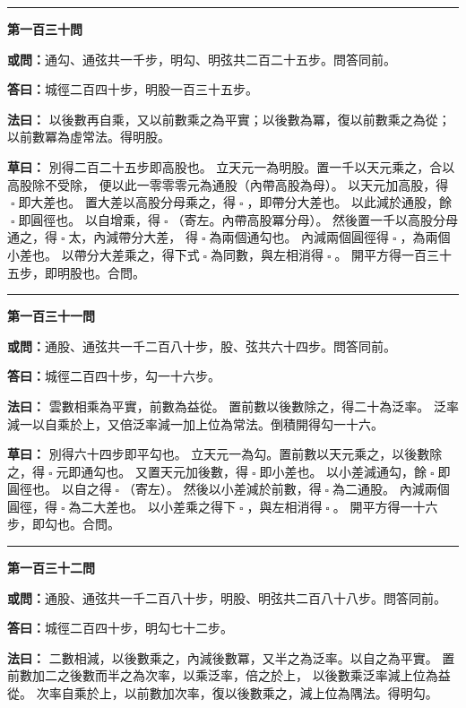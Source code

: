 \documentclass[11pt,a4paper]{article}
\let\origsquare\square
\renewcommand{\square}{\ensuremath{\origsquare}}%
\newcommand{\longline}{\noindent\rule{\textwidth}{0.4pt}}
\newcommand{\owen}[1]{%
  \par\vspace{0.4em}%
  \noindent\textcolor{problemcolor}{\textbf{或問：}}{\tradfont #1}\par\nopagebreak%
}
\newcommand{\fayue}[1]{%
  \par\noindent\textcolor{methodcolor}{\textbf{法曰：}}{\tradfont #1}\par\nopagebreak%
}
\newcommand{\tsaoyue}[1]{%
  \par\noindent\textcolor{workcolor}{\textbf{草曰：}}{\tradfont #1}\par%
}
\newcommand{\dayue}[1]{%
  \par\noindent\textcolor{anscolor}{\textbf{答曰：}}{\tradfont #1}\par\nopagebreak%
}
\newcommand{\wen}[1]{\par\vspace{0.3em}\noindent\textcolor{problemcolor}{\textbf{第#1問}}\par}
\begin{document}
\vspace{0.5cm}
\begin{center}
\longline
\end{center}

\wen{一百三十}
\owen{通勾、通弦共一千步，明勾、明弦共二百二十五步。問答同前。}
\dayue{城徑二百四十步，明股一百三十五步。}

\fayue{%
以後數再自乘，又以前數乘之為平實；以後數為冪，復以前數乘之為從；
以前數冪為虛常法。得明股。}

\tsaoyue{%
別得二百二十五步即高股也。
立天元一為明股。置一千以天元乘之，合以高股除不受除，
便以此一零零零元為通股（內帶高股為母）。
以天元加高股，得$ \; \square \; $即大差也。
置大差以高股分母乘之，得$ \; \square \; $，即帶分大差也。
以此減於通股，餘$ \; \square \; $即圓徑也。
以自增乘，得$ \; \square \; $（寄左。內帶高股冪分母）。
然後置一千以高股分母通之，得$ \; \square \; $太，內減帶分大差，
得$ \; \square \; $為兩個通勾也。
內減兩個圓徑得$ \; \square \; $，為兩個小差也。
以帶分大差乘之，得下式$ \; \square \; $為同數，與左相消得$ \; \square \; $。
開平方得一百三十五步，即明股也。合問。}

\vspace{0.5cm}
\begin{center}
\longline
\end{center}

\wen{一百三十一}
\owen{通股、通弦共一千二百八十步，股、弦共六十四步。問答同前。}
\dayue{城徑二百四十步，勾一十六步。}

\fayue{%
雲數相乘為平實，前數為益從。
置前數以後數除之，得二十為泛率。
泛率減一以自乘於上，又倍泛率減一加上位為常法。倒積開得勾一十六。}

\tsaoyue{%
別得六十四步即平勾也。
立天元一為勾。置前數以天元乘之，以後數除之，得$ \; \square \; $元即通勾也。
又置天元加後數，得$ \; \square \; $即小差也。
以小差減通勾，餘$ \; \square \; $即圓徑也。
以自之得$ \; \square \; $（寄左）。
然後以小差減於前數，得$ \; \square \; $為二通股。
內減兩個圓徑，得$ \; \square \; $為二大差也。
以小差乘之得下$ \; \square \; $，與左相消得$ \; \square \; $。
開平方得一十六步，即勾也。合問。}

\vspace{0.5cm}
\begin{center}
\longline
\end{center}

\wen{一百三十二}
\owen{通股、通弦共一千二百八十步，明股、明弦共二百八十八步。問答同前。}
\dayue{城徑二百四十步，明勾七十二步。}

\fayue{%
二數相減，以後數乘之，內減後數冪，又半之為泛率。以自之為平實。
置前數加二之後數而半之為次率，以乘泛率，倍之於上，
以後數乘泛率減上位為益從。
次率自乘於上，以前數加次率，復以後數乘之，減上位為隅法。得明勾。}
\end{document}
